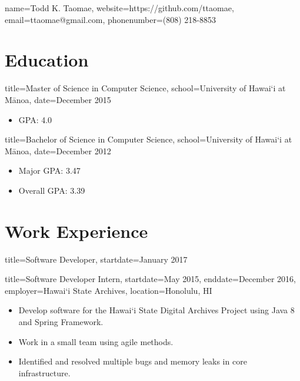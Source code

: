 \documentclass{resume}
\newcommand{\hawaii}{Hawai\lq i}
\newcommand{\uhm}{University of \hawaii{} at M\={a}noa}
\begin{document}
\begin{header}{name=Todd K. Taomae,
            website=https://github.com/ttaomae,
            email=ttaomae@gmail.com,
            phonenumber=(808) 218-8853}
\end{header}

\section*{Education}
\begin{degree}{title=Master of Science in Computer Science,
               school=\uhm,
               date=December 2015}
    \begin{itemize}
        \item{GPA: 4.0}
    \end{itemize}
\end{degree}

\begin{degree}{title=Bachelor of Science in Computer Science,
               school=\uhm,
               date=December 2012}
    \begin{itemize}
        \item{Major GPA: 3.47}
        \item{Overall GPA: 3.39}
    \end{itemize}
\end{degree}

\section*{Work Experience}
\begin{job}{title=Software Developer,
            startdate=January 2017}
\end{job}
\begin{job}{title=Software Developer Intern,
            startdate=May 2015,
            enddate=December 2016,
            employer=\hawaii{} State Archives,
            location={Honolulu, HI}}
    \begin{itemize}
        \item{Develop software for the \hawaii{} State Digital Archives Project using Java 8 and Spring Framework.}
        \item{Work in a small team using agile methods.}
        \item{Identified and resolved multiple bugs and memory leaks in core infrastructure.}
    \end{itemize}
\end{job}
\end{document}
